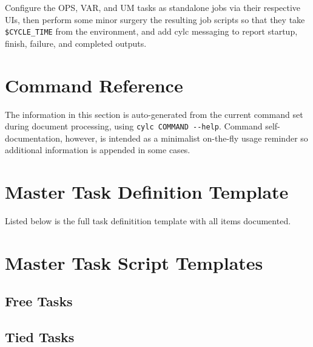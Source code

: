 \documentclass[11pt,a4paper]{article}
\begin{document}
Configure the OPS, VAR, and UM tasks as standalone jobs via their
respective UIs, then perform some minor surgery the resulting
job scripts so that they take \lstinline=$CYCLE_TIME= from the
environment, and add cylc messaging to report startup, finish, failure,
and completed outputs.

\pagebreak
\section{Command Reference}
\label{CommandReference}

The information in this section is auto-generated from
the current command set during document processing, using  
\lstinline=cylc COMMAND --help=. 
Command self-documentation, however, is intended as a minimalist
on-the-fly usage reminder so additional information is appended in
some cases.
  
\lstset{language=usage}



\pagebreak
\section{Master Task Definition Template}
\label{MasterTaskDefinitionTemplate}

Listed below is the full task definitition template with all items
documented.

\lstset{language=cylctaskdef}



\lstset{language=}

\pagebreak
\section{Master Task Script Templates}
\label{MasterTaskScriptTemplates}



\lstset{language=bash}

\pagebreak
\subsection{Free Tasks}


\pagebreak
\subsection{Tied Tasks}

\end{document}
